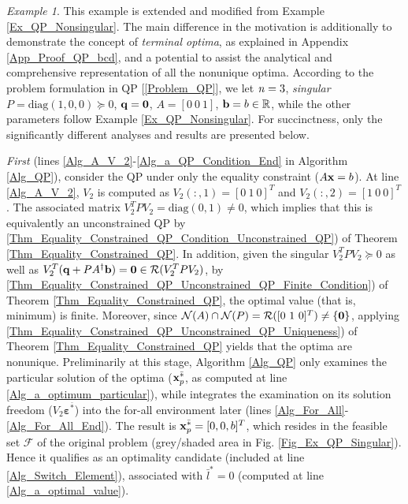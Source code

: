 \documentclass[9pt,twocolumn,twoside,lineno]{pnas-new-1}
\newcommand{\bfb}{{\bf b}}
\newcommand{\bfx}{{\bf x}}
\newcommand{\bfq}{{\bf q}}
\newcommand{\bfvarepsilon}{{\boldsymbol \varepsilon}}
\newcommand{\bfzero}{{\bf 0}}
\newcommand{\real}{\mathbb{R}}
\newcommand{\calF}{{\mathcal F}}
\newcommand{\calN}{{\mathcal N}}
\newcommand{\calR}{{\mathcal R}}
\newcommand{\itn}{{\it n}}
\theoremstyle{remark}
\newtheorem{example}{Example}[section]
\begin{document}
\begin{example}
This example is extended and modified from Example \ref{Ex_QP_Nonsingular}. The main difference in the motivation is additionally to demonstrate the concept of \textit{terminal optima}, as explained in Appendix \ref{App_Proof_QP_bcd}, and a potential to assist the analytical and comprehensive representation of all the nonunique optima. According to the problem formulation in QP [\ref{Problem_QP}], we let $\itn=3$, \textit{singular} $P=\mbox{diag}(1,0,0)\succeq 0$, $\bfq=\bfzero$, $A=[0~0~1]$, $\bfb=b\in\real$, while the other parameters follow Example \ref{Ex_QP_Nonsingular}. For succinctness, only the significantly different analyses and results are presented below.

\textit{First} (lines \ref{Alg_A_V_2}-\ref{Alg_a_QP_Condition_End} in Algorithm \ref{Alg_QP}), consider the QP under only the equality constraint ($A\bfx=b$). At line \ref{Alg_A_V_2}, $V_2$ is computed as $V_2(:,1)=[0~1~0]^T$ and $V_2(:,2)=[1~0~0]^T$. The associated matrix $V_2^TPV_2=\mbox{diag}(0,1)\ne 0$, which implies that this is equivalently an unconstrained QP by \ref{Thm_Equality_Constrained_QP_Condition_Unconstrained_QP}) of Theorem \ref{Thm_Equality_Constrained_QP}. In addition, given the singular $V_2^TPV_2\succeq 0$ as well as $V_2^T(\bfq+PA^\dagger\bfb)=\bfzero\in\calR(V_2^TPV_2)$, by \ref{Thm_Equality_Constrained_QP_Unconstrained_QP_Finite_Condition}) of Theorem \ref{Thm_Equality_Constrained_QP}, the optimal value (that is, minimum) is finite. Moreover, since $\calN(A)\cap\calN(P)=\calR([0~1~0]^T)\ne\{\bfzero\}$, applying \ref{Thm_Equality_Constrained_QP_Unconstrained_QP_Uniqueness}) of Theorem \ref{Thm_Equality_Constrained_QP} yields that the optima are nonunique. Preliminarily at this stage, Algorithm \ref{Alg_QP} only examines the particular solution of the optima ($\bfx_p^{\bar *}$, as computed at line \ref{Alg_a_optimum_particular}), while integrates the examination on its solution freedom ($V_2\bfvarepsilon^{\bar *}$) into the for-all environment later (lines \ref{Alg_For_All}-\ref{Alg_For_All_End}). The result is $\bfx_p^{\bar *}=[0,0,b]^T$, which resides in the feasible set $\calF$ of the original problem (grey/shaded area in Fig. \ref{Fig_Ex_QP_Singular}). Hence it qualifies as an optimality candidate (included at line \ref{Alg_Switch_Element}), associated with $\bar l^{*}=0$ (computed at line \ref{Alg_a_optimal_value}).


\end{example}
\end{document}
